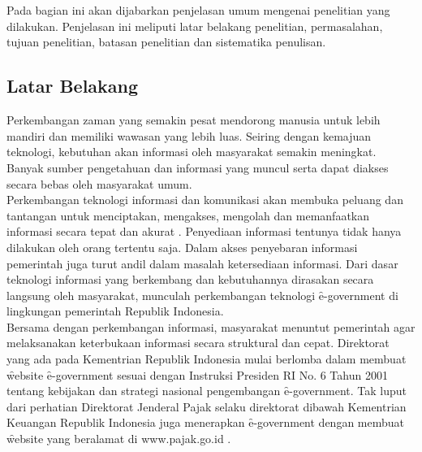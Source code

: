 \chapter{\babSatu}

Pada bagian ini akan dijabarkan penjelasan umum mengenai penelitian yang dilakukan. Penjelasan ini meliputi latar belakang penelitian, permasalahan, tujuan penelitian, batasan penelitian dan sistematika penulisan.

\section{Latar Belakang}
Perkembangan zaman yang semakin pesat mendorong manusia untuk lebih mandiri dan memiliki wawasan yang lebih luas. Seiring dengan kemajuan teknologi, kebutuhan akan informasi oleh masyarakat semakin meningkat. Banyak sumber pengetahuan dan informasi yang muncul serta dapat diakses secara bebas oleh masyarakat umum.
\newline\\
Perkembangan teknologi informasi dan komunikasi akan membuka peluang dan tantangan untuk menciptakan, mengakses, mengolah dan memanfaatkan informasi secara tepat dan akurat \citep{buku.hasibua}. Penyediaan informasi tentunya tidak hanya dilakukan oleh orang tertentu saja. Dalam akses penyebaran informasi pemerintah juga turut andil dalam masalah ketersediaan informasi. Dari dasar teknologi informasi yang berkembang dan kebutuhannya dirasakan secara langsung oleh masyarakat, munculah perkembangan teknologi \f{e-government} di lingkungan pemerintah Republik Indonesia. 
\newline\\
Bersama dengan perkembangan informasi, masyarakat menuntut pemerintah agar melaksanakan keterbukaan informasi secara struktural dan cepat. Direktorat yang ada pada Kementrian Republik Indonesia mulai berlomba dalam membuat \f{website} \f{e-government} sesuai dengan Instruksi Presiden RI No. 6 Tahun 2001 tentang kebijakan dan strategi nasional pengembangan \f{e-government}. Tak luput dari perhatian Direktorat Jenderal Pajak selaku direktorat dibawah Kementrian Keuangan Republik Indonesia juga menerapkan \f{e-government} dengan membuat \f{website} yang beralamat di www.pajak.go.id . 
